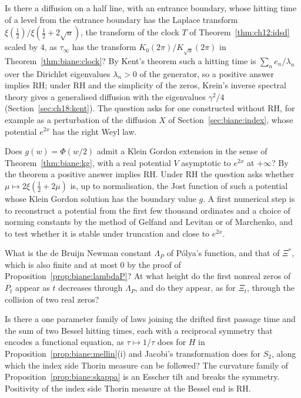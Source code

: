 \begin{question}\label{q:biane:radial}
Is there a diffusion on a half line, with an entrance boundary, whose hitting time of a level from the entrance boundary has the Laplace transform $\xi(\frac12)/\xi(\frac12+2\sqrt u)$, the transform of the clock $T$ of Theorem~\ref{thm:ch12:idsd} scaled by $4$, as $\tau_\infty$ has the transform $K_0(2\pi)/K_{\sqrt u}(2\pi)$ in Theorem~\ref{thm:biane:clock}? By Kent's theorem \cite{Kent80} such a hitting time is $\sum_ne_n/\lambda_n$ over the Dirichlet eigenvalues $\lambda_n>0$ of the generator, so a positive answer implies RH; under RH and the simplicity of the zeros, Krein's inverse spectral theory gives a generalised diffusion with the eigenvalues $\gamma^2/4$ (Section~\ref{sec:ch18:kent}). The question asks for one constructed without RH, for example as a perturbation of the diffusion $X$ of Section~\ref{sec:biane:index}, whose potential $e^{2x}$ has the right Weyl law.
\end{question}

\begin{question}\label{q:biane:kg}
Does $g(w)=\Phi(w/2)$ admit a Klein Gordon extension in the sense of Theorem~\ref{thm:biane:kg}, with a real potential $V$ asymptotic to $e^{2x}$ at $+\infty$? By the theorem a positive answer implies RH. Under RH the question asks whether $\mu\mapsto2\xi(\frac12+2\mu)$ is, up to normalisation, the Jost function of such a potential whose Klein Gordon solution has the boundary value $g$. A first numerical step is to reconstruct a potential from the first few thousand ordinates and a choice of norming constants by the method of Gelfand and Levitan or of Marchenko, and to test whether it is stable under truncation and close to $e^{2x}$.
\end{question}

\begin{question}\label{q:biane:lambda}
What is the de Bruijn Newman constant $\Lambda_P$ of P\'olya's function, and that of $\Xi^*$, which is also finite and at most $0$ by the proof of Proposition~\ref{prop:biane:lambdaP}? At what height do the first nonreal zeros of $P_t$ appear as $t$ decreases through $\Lambda_P$, and do they appear, as for $\Xi_t$, through the collision of two real zeros?
\end{question}

\begin{question}\label{q:biane:curv}
Is there a one parameter family of laws joining the drifted first passage time and the sum of two Bessel hitting times, each with a reciprocal symmetry that encodes a functional equation, as $\tau\mapsto1/\tau$ does for $H$ in Proposition~\ref{prop:biane:mellin}(i) and Jacobi's transformation does for $S_2$, along which the index side Thorin measure can be followed? The curvature family of Proposition~\ref{prop:biane:skappa} is an Esscher tilt and breaks the symmetry. Positivity of the index side Thorin measure at the Bessel end is RH.
\end{question}

